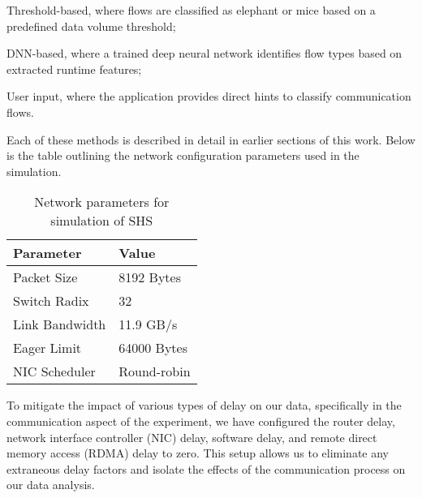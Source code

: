 Threshold-based, where flows are classified as elephant or mice based on a predefined data volume threshold;

DNN-based, where a trained deep neural network identifies flow types based on extracted runtime features;

User input, where the application provides direct hints to classify communication flows.

Each of these methods is described in detail in earlier sections of this work. Below is the table outlining the network configuration parameters used in the simulation.

\begin{table}[h]
\centering
\caption{Network parameters for simulation of SHS}
\label{tab:params}
\vspace{1em}
\begin{tabular}{ll}
\toprule
Parameter & Value \\
\midrule
Packet Size     & 8192 Bytes \\
Switch Radix    & 32 \\
Link Bandwidth  & 11.9 GB/s \\
Eager Limit     & 64000 Bytes \\
NIC Scheduler   & Round-robin \\
\bottomrule
\end{tabular}
\end{table}



To mitigate the impact of various types of delay on our data, specifically in 
the communication aspect of the experiment, we have configured the router 
delay, network interface controller (NIC) delay, software delay, and remote 
direct memory access (RDMA) delay to zero. This setup allows us to eliminate 
any extraneous delay factors and isolate the effects of the communication 
process on our data analysis.

